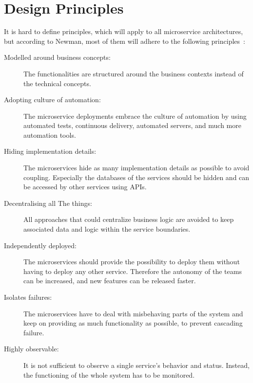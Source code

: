 \section{Design Principles}
It is hard to define principles, which will apply to all microservice architectures, but according to Newman, most of them will adhere to the following principles~\cite{newman2021building}: 
\begin{description}
    \item[Modelled around business concepts:] The functionalities are structured around the business contexts instead of the technical concepts.
    \item[Adopting culture of automation:] The microservice deployments embrace the culture of automation by using automated tests, continuous delivery, automated servers, and much more automation tools.
    \item[Hiding implementation details:] The microservices hide as many implementation details as possible to avoid coupling.
		Especially the databases of the services should be hidden and can be accessed by other services using APIs.
    \item[Decentralising all The things:] All approaches that could centralize business logic are avoided to keep associated data and logic within the service boundaries.
    \item[Independently deployed:] The microservices should provide the possibility to deploy them without having to deploy any other service.
		Therefore the autonomy of the teams can be increased, and new features can be released faster.
    \item[Isolates failures:] The microservices have to deal with misbehaving parts of the system and keep on providing as much functionality as possible, to prevent cascading failure.
    \item[Highly observable:] It is not sufficient to observe a single service's behavior and status.
		Instead, the functioning of the whole system has to be monitored.
\end{description}

